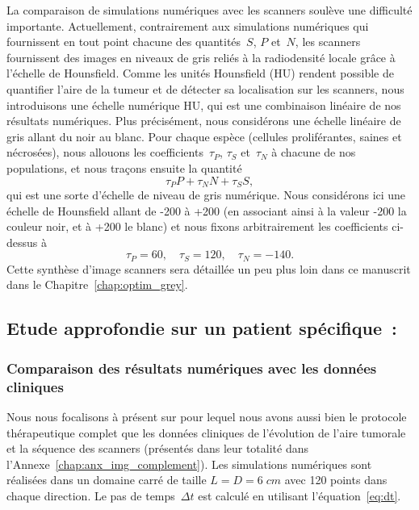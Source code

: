 \documentclass[main.tex]{subfiles}
\begin{document}
La comparaison de simulations numériques 
avec les scanners soulève une difficulté importante. 
Actuellement, contrairement aux simulations numériques qui fournissent en tout point chacune des quantités~$S$, $P$ et~$N$, les scanners fournissent des images en niveaux de gris reliés à la radiodensité locale grâce à l'échelle de 
Hounsfield. Comme les unités Hounsfield (HU) rendent possible de quantifier 
l'aire de la tumeur et de détecter sa localisation sur les scanners, nous introduisons une échelle numérique HU, qui est une combinaison linéaire de nos résultats numériques. 
Plus précisément, nous considérons une échelle linéaire de gris allant du noir au blanc. Pour chaque espèce (cellules proliférantes, saines et nécrosées), nous allouons les 
coefficients~$\tau_P$, $\tau_S$ et~$\tau_N$ à chacune de nos populations, et nous traçons ensuite la quantité
\begin{equation}\label{eq:grey_level}
\tau_P P + \tau_N N + \tau_S S,
\end{equation}
qui est une sorte d'échelle de niveau de gris numérique. 
Nous considérons ici une échelle de Hounsfield allant de 
-200 à +200 (en associant ainsi à la valeur -200 la couleur noir, et à +200 le blanc) et nous fixons arbitrairement les coefficients ci-dessus à 
\begin{equation}\label{eq:tau_arbitraire}
\tau_P=60,\quad \tau_S=120,\quad \tau_N=-140.
\end{equation}
Cette synthèse d'image scanners sera détaillée un peu plus loin dans ce manuscrit dans le Chapitre~\ref{chap:optim_grey}.


\subsection{Etude approfondie sur un patient spécifique~: \Nber}
\subsubsection{Comparaison des résultats numériques avec les données cliniques}
Nous nous focalisons à présent sur \Nber pour lequel nous avons aussi bien le protocole thérapeutique complet que les données cliniques de l'évolution de l'aire tumorale et la séquence des scanners (présentés dans leur totalité dans l'Annexe~\ref{chap:anx_img_complement}). 
Les simulations numériques sont réalisées dans un domaine carré de taille 
$L=D=6\;cm$ avec 120 points dans chaque direction. 
Le pas de temps~$\Delta t$ est calculé en utilisant l'équation~\eqref{eq:dt}. 
\end{document}
